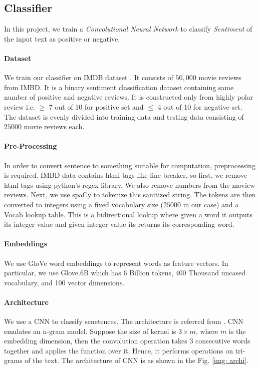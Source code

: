 \documentclass[12pt]{report}
\begin{document}
\begin{spacing}{1.5}
\section{Classifier}
In this project, we train a \textit{Convolutional Neural Network} to classify \textit{Sentiment} of the input text as positive or negative.
 \paragraph{Dataset}
We train our classifier on IMDB dataset \cite{imdb}. It consists of $50,000$ movie reviews from IMBD. It is a binary sentiment classification dataset containing same number of positive and negative reviews. It is constructed only from highly polar review i.e. $\geq$ 7 out of 10 for positive set and $\leq$ 4 out of 10 for negative set. The dataset is evenly divided into training data and testing data consisting of $25000$ movie reviews each.

\paragraph{Pre-Processing}
In order to convert sentence to something suitable for computation, preprocessing is required.
IMBD data contains html tags like line breaker, so first, we remove html tags using python's regex library. We also remove numbers from the moview reviews.
Next, we use spaCy \cite{spacy} to tokenize this sanitized string.
The tokens are then converted to integers using a fixed vocabulary size ($25000$ in our case) and a Vocab lookup table. This is a bidirectional lookup where given a word it outputs its integer value and given integer value its returns its corresponding word.
 
\paragraph{Embeddings}
We use GloVe \cite{glove} word embeddings to represent words as feature vectors.
In particular, we use Glove.6B which has 6 Billion tokens, 400 Thousand uncased vocabulary, and 100 vector dimensions.

\paragraph{Architecture}
We use a CNN to classify senetences. The architecture is referred from \cite{kim2014}.
CNN emulates an n-gram model. Suppose the size of kernel is $3 \times m$, where $m$ is the embedding dimension, then the convolution operation takes $3$ consecutive words together and applies the function over it. Hence, it performs operations on tri-grams of the text.
The architecture of CNN is as shown in the Fig. \ref{img: archi}.


\end{spacing}
\end{document}
